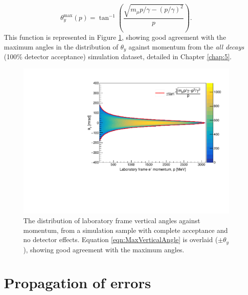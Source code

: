 \begin{appendices}
%
\begin{equation}
  \theta_{y}^{\text{max}}(p) = \tan^{-1} \left(\frac{\sqrt{{m_{\mu}p/\gamma} - (p/\gamma)^{2} }}{p}\right).
  \label{eqn:MaxVerticalAngle}
\end{equation}
%
This function is represented in Figure \ref{fig:MaxVerticalAngle}, showing good agreement with the maximum angles in the distribution of $\theta_{y}$ against momentum from the \textit{all decays} (100\% detector acceptance) simulation dataset, detailed in Chapter \ref{chap:5}.
%
\begin{figure}[t!]
\centering{}
\includegraphics[trim={0 0 0 0},clip,width=.69\textwidth]{Images/Appendix/2DFit.pdf}
\caption{The distribution of laboratory frame vertical angles against momentum, from a simulation sample with complete acceptance and no detector effects. Equation \ref{eqn:MaxVerticalAngle} is overlaid ($\pm \theta_{y}$), showing good agreement with the maximum angles.}
\label{fig:MaxVerticalAngle}
\end{figure}

\chapter[Propagation of errors]{Propagation of errors}\label{app:Unc}


\end{appendices}
